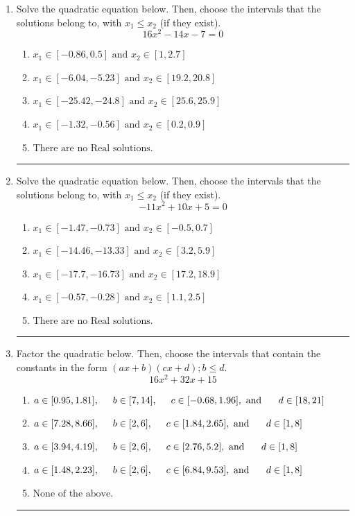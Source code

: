 \documentclass[14pt]{extbook}
\newcommand{\litem}[1]{\item#1\hspace*{-1cm}\rule{\textwidth}{0.4pt}}
\begin{document}
\begin{enumerate}
\litem{
Solve the quadratic equation below. Then, choose the intervals that the solutions belong to, with $x_1 \leq x_2$ (if they exist).\[ 16x^{2} -14 x -7 = 0 \]\begin{enumerate}[label=\Alph*.]
\item \( x_1 \in [-0.86, 0.5] \text{ and } x_2 \in [1, 2.7] \)
\item \( x_1 \in [-6.04, -5.23] \text{ and } x_2 \in [19.2, 20.8] \)
\item \( x_1 \in [-25.42, -24.8] \text{ and } x_2 \in [25.6, 25.9] \)
\item \( x_1 \in [-1.32, -0.56] \text{ and } x_2 \in [0.2, 0.9] \)
\item \( \text{There are no Real solutions.} \)

\end{enumerate} }
\litem{
Solve the quadratic equation below. Then, choose the intervals that the solutions belong to, with $x_1 \leq x_2$ (if they exist).\[ -11x^{2} +10 x + 5 = 0 \]\begin{enumerate}[label=\Alph*.]
\item \( x_1 \in [-1.47, -0.73] \text{ and } x_2 \in [-0.5, 0.7] \)
\item \( x_1 \in [-14.46, -13.33] \text{ and } x_2 \in [3.2, 5.9] \)
\item \( x_1 \in [-17.7, -16.73] \text{ and } x_2 \in [17.2, 18.9] \)
\item \( x_1 \in [-0.57, -0.28] \text{ and } x_2 \in [1.1, 2.5] \)
\item \( \text{There are no Real solutions.} \)

\end{enumerate} }
\litem{
Factor the quadratic below. Then, choose the intervals that contain the constants in the form $(ax+b)(cx+d); b \leq d.$\[ 16x^{2} +32 x + 15 \]\begin{enumerate}[label=\Alph*.]
\item \( a \in [0.95, 1.81], \hspace*{5mm} b \in [7, 14], \hspace*{5mm} c \in [-0.68, 1.96], \text{ and } \hspace*{5mm} d \in [18, 21] \)
\item \( a \in [7.28, 8.66], \hspace*{5mm} b \in [2, 6], \hspace*{5mm} c \in [1.84, 2.65], \text{ and } \hspace*{5mm} d \in [1, 8] \)
\item \( a \in [3.94, 4.19], \hspace*{5mm} b \in [2, 6], \hspace*{5mm} c \in [2.76, 5.2], \text{ and } \hspace*{5mm} d \in [1, 8] \)
\item \( a \in [1.48, 2.23], \hspace*{5mm} b \in [2, 6], \hspace*{5mm} c \in [6.84, 9.53], \text{ and } \hspace*{5mm} d \in [1, 8] \)
\item \( \text{None of the above.} \)


\end{enumerate}}
\end{enumerate}
\end{document}
